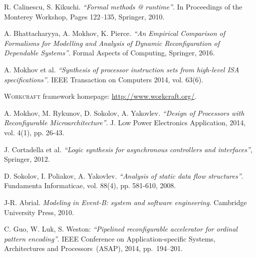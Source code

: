 \documentclass[conference]{IEEEtran}
\begin{document}
\begin{thebibliography}{10}

R. Calinescu, S. Kikuchi. \emph{``Formal methods @ runtime''}. In Proceedings of the Monterey Workshop, Pages 122–135, Springer, 2010.

A. Bhattacharyya, A. Mokhov, K. Pierce. \emph{``An Empirical Comparison of Formalisms for Modelling and Analysis of Dynamic Reconfiguration of Dependable Systems''}. Formal Aspects of Computing, Springer, 2016.

A. Mokhov et al.
\emph{``Synthesis of processor instruction sets from high-level ISA specifications''}. IEEE Transaction on Computers 2014, vol. 63(6).

    \textsc{Workcraft} framework homepage: \url{http://www.workcraft.org/}.

  A. Mokhov, M. Rykunov, D. Sokolov, A. Yakovlev.
  \emph{``Design of Processors with Reconfigurable Microarchitecture''}.
  J. Low Power Electronics Application, 2014, vol. 4(1), pp. 26-43.

J. Cortadella et al. \emph{``Logic synthesis for asynchronous controllers and interfaces''}, Springer, 2012.

  D. Sokolov, I. Poliakov, A. Yakovlev. \emph{``Analysis of static data flow structures''}. Fundamenta Informaticae, vol. 88(4), pp. 581-610, 2008.

  J-R. Abrial. \emph{Modeling in Event-B: system and software engineering}. Cambridge University Press, 2010.

  C. Guo, W. Luk, S. Weston:
  \emph{``Pipelined reconfigurable accelerator for ordinal pattern encoding''}.
  IEEE Conference on Application-specific Systems, Architectures and Processors~(ASAP), 2014,
  pp.~194--201.




\end{thebibliography}
\end{document}
